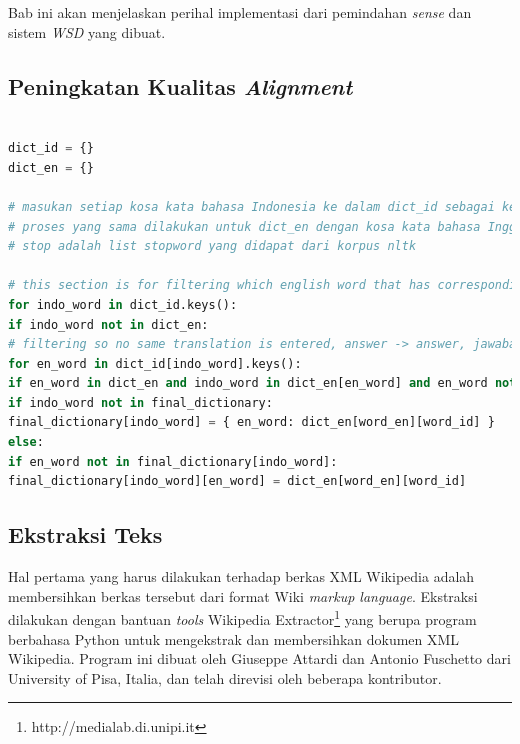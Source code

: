 \chapter{\babEmpat} \label{implementasi}
Bab ini akan menjelaskan perihal implementasi dari pemindahan \textit{sense} dan sistem \textit{WSD} yang dibuat.


\section{Peningkatan Kualitas \textit{Alignment}}

\begin{lstlisting}[language=Python, caption={Word Alignment Enhancement}, label={word-alignment-enhancement}]

dict_id = {}
dict_en = {}

# masukan setiap kosa kata bahasa Indonesia ke dalam dict_id sebagai key dan kumpulan pasangan kata bahasa inggrisnya sebagai value
# proses yang sama dilakukan untuk dict_en dengan kosa kata bahasa Inggris sebagai key dan kumpulan pasangan kata bahasa Indonesia sebagai value
# stop adalah list stopword yang didapat dari korpus nltk

# this section is for filtering which english word that has corresponding indo translation (bidirectional) from Giza output
for indo_word in dict_id.keys():
if indo_word not in dict_en:
# filtering so no same translation is entered, answer -> answer, jawaban -> jawaban
for en_word in dict_id[indo_word].keys():
if en_word in dict_en and indo_word in dict_en[en_word] and en_word not in stop:
if indo_word not in final_dictionary:
final_dictionary[indo_word] = { en_word: dict_en[word_en][word_id] }
else:
if en_word not in final_dictionary[indo_word]:
final_dictionary[indo_word][en_word] = dict_en[word_en][word_id]
\end{lstlisting}


\section{Ekstraksi Teks}
Hal pertama yang harus dilakukan terhadap berkas XML Wikipedia adalah membersihkan berkas tersebut dari format Wiki \textit{markup language}. Ekstraksi dilakukan dengan bantuan \textit{tools} Wikipedia Extractor\footnote{http://medialab.di.unipi.it} yang berupa program berbahasa Python untuk mengekstrak dan membersihkan dokumen XML Wikipedia. Program ini dibuat oleh Giuseppe Attardi dan Antonio Fuschetto dari University of Pisa, Italia, dan telah direvisi oleh beberapa kontributor. 

